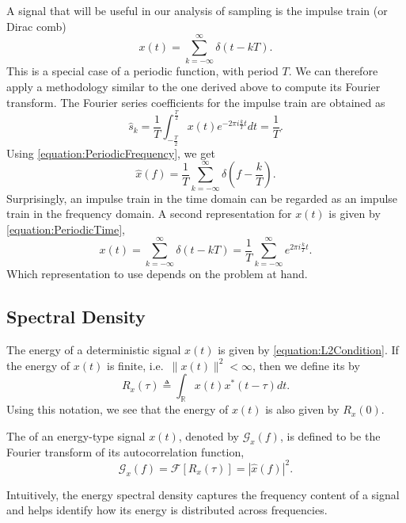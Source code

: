 A signal that will be useful in our analysis of sampling is the impulse train (or Dirac comb)
\begin{equation*}
x(t) = \sum_{k = -\infty}^{\infty} \delta(t - kT) .
\end{equation*}
This is a special case of a periodic function, with period $T$.
We can therefore apply a methodology similar to the one derived above to compute its Fourier transform.
The Fourier series coefficients for the impulse train are obtained as
\begin{equation*}
\hat{s}_k = \frac{1}{T} \int_{-\frac{T}{2}}^{\frac{T}{2}}
x(t) e^{- 2 \pi i \frac{k}{T} t} dt
= \frac{1}{T} .
\end{equation*}
Using \eqref{equation:PeriodicFrequency}, we get
\begin{equation} \label{equation:ImpulseTrainFrequency}
\hat{x}(f)
= \frac{1}{T} \sum_{k = -\infty}^{\infty} \delta \left( f - \frac{k}{T} \right) .
\end{equation}
Surprisingly, an impulse train in the time domain can be regarded as an impulse train in the frequency domain.
A second representation for $x(t)$ is given by \eqref{equation:PeriodicTime},
\begin{equation} \label{equation:ImpulseTrainTime}
x(t) = \sum_{k = -\infty}^{\infty} \delta(t - kT)
= \frac{1}{T} \sum_{k = -\infty}^{\infty} e^{2 \pi i \frac{k}{T} t} .
\end{equation}
Which representation to use depends on the problem at hand.


\subsection{Spectral Density}
\label{subsection:SpectralDensity}

The energy of a deterministic signal $x(t)$ is given by \eqref{equation:L2Condition}.
If the energy of $x(t)$ is finite, i.e.\ $\| x(t) \|^2 < \infty$, then we define its  by
\begin{equation*}
R_x(\tau) \triangleq \int_{\mathbb{R}} x(t)x^*(t - \tau) dt .
\end{equation*}
Using this notation, we see that the energy of $x(t)$ is also given by $R_x(0)$.

\begin{definition}
The  of an energy-type signal $x(t)$, denoted by $\mathcal{G}_x (f)$, is defined to be the Fourier transform of its autocorrelation function,
\begin{equation*}
\mathcal{G}_x(f) = \mathcal{F} [ R_x (\tau) ] = | \hat{x}(f) |^2.
\end{equation*}
\end{definition}
Intuitively, the energy spectral density captures the frequency content of a signal and helps identify how its energy is distributed across frequencies.


